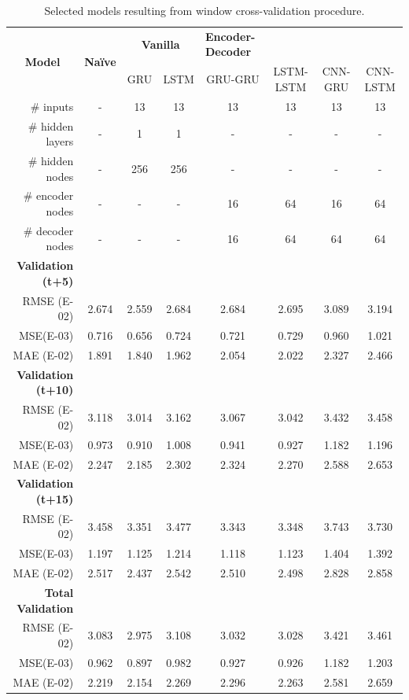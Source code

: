 \begin{table}[htbp]
  \centering
  \caption{Selected models resulting from window cross-validation procedure.}
    \begin{tabular}{r|c|cc|cccc}
    \multicolumn{1}{c|}{\multirow{2}[0]{*}{\textbf{Model}}} & \multirow{2}[0]{*}{\textbf{Naïve}} & \multicolumn{2}{c|}{\textbf{Vanilla}} & \multicolumn{1}{l}{\textbf{Encoder-Decoder}} &   &   &  \\
      &   & GRU & LSTM & GRU-GRU & LSTM-LSTM & CNN-GRU & CNN-LSTM \\
    \# inputs & - & 13 & 13 & 13 & 13 & 13 & 13 \\
    \# hidden layers & - & 1 & 1 & - & - & - & - \\
    \# hidden nodes & - & 256 & 256 & - & - & - & - \\
    \# encoder nodes & - & - & - & 16 & 64 & 16 & 64 \\
    \# decoder nodes & - & - & - & 16 & 64 & 64 & 64 \\
    \midrule
    \textbf{Validation (t+5)} &   &   &   &   &   &   &  \\
    RMSE (E-02) & 2.674 & 2.559 & 2.684 & 2.684 & 2.695 & 3.089 & 3.194 \\
    MSE(E-03) & 0.716 & 0.656 & 0.724 & 0.721 & 0.729 & 0.960 & 1.021 \\
    MAE (E-02) & 1.891 & 1.840 & 1.962 & 2.054 & 2.022 & 2.327 & 2.466 \\
    \textbf{Validation (t+10)} &   &   &   &   &   &   &  \\
    RMSE (E-02) & 3.118 & 3.014 & 3.162 & 3.067 & 3.042 & 3.432 & 3.458 \\
    MSE(E-03) & 0.973 & 0.910 & 1.008 & 0.941 & 0.927 & 1.182 & 1.196 \\
    MAE (E-02) & 2.247 & 2.185 & 2.302 & 2.324 & 2.270 & 2.588 & 2.653 \\
    \textbf{Validation (t+15)} &   &   &   &   &   &   &  \\
    RMSE (E-02) & 3.458 & 3.351 & 3.477 & 3.343 & 3.348 & 3.743 & 3.730 \\
    MSE(E-03) & 1.197 & 1.125 & 1.214 & 1.118 & 1.123 & 1.404 & 1.392 \\
    MAE (E-02) & 2.517 & 2.437 & 2.542 & 2.510 & 2.498 & 2.828 & 2.858 \\
    \midrule
    \textbf{Total Validation} &   &   &   &   &   &   &  \\
    RMSE (E-02) & 3.083 & 2.975 & 3.108 & 3.032 & 3.028 & 3.421 & 3.461 \\
    MSE(E-03) & 0.962 & 0.897 & 0.982 & 0.927 & 0.926 & 1.182 & 1.203 \\
    MAE (E-02) & 2.219 & 2.154 & 2.269 & 2.296 & 2.263 & 2.581 & 2.659 \\
    \end{tabular}%
  \label{valres}%
\end{table}%

